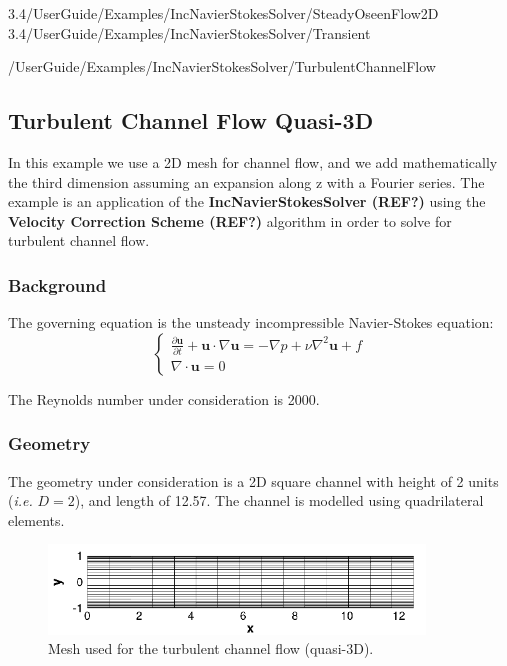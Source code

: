 \newpage









3.4/UserGuide/Examples/IncNavierStokesSolver/SteadyOseenFlow2D
3.4/UserGuide/Examples/IncNavierStokesSolver/Transient

/UserGuide/Examples/IncNavierStokesSolver/TurbulentChannelFlow
\subsection{Turbulent Channel Flow Quasi-3D}
In this example we use a 2D mesh for channel flow, and we add mathematically the third dimension assuming an expansion along z with a Fourier series. The example is an application of the \textbf{IncNavierStokesSolver  (REF?)} using the \textbf{Velocity Correction Scheme (REF?)} algorithm in order to solve for turbulent channel flow.

\subsubsection{Background}
The governing equation is the unsteady incompressible Navier-Stokes equation:
\begin{equation}
\begin{cases}
\frac{\partial \textbf{u}}{\partial t} + \textbf{u} \cdot \nabla \textbf{u} = - \nabla p + \nu \nabla^2 \textbf{u} + f \\
\nabla \cdot \textbf{u} = 0
\label{IncNS_equations}
\end{cases}
\end{equation}

The Reynolds number under consideration is 2000.

\subsubsection{Geometry}
The geometry under consideration is a 2D square channel with height of 2 units (\textit{i.e.} $D=2$), and length of 12.57. The channel is modelled using quadrilateral elements.
\begin{figure}
\begin{center}
\includegraphics[width=10cm]{Figures/ChanMesh.png}
\caption{Mesh used for the turbulent channel flow (quasi-3D).}
\end{center}
\end{figure}

